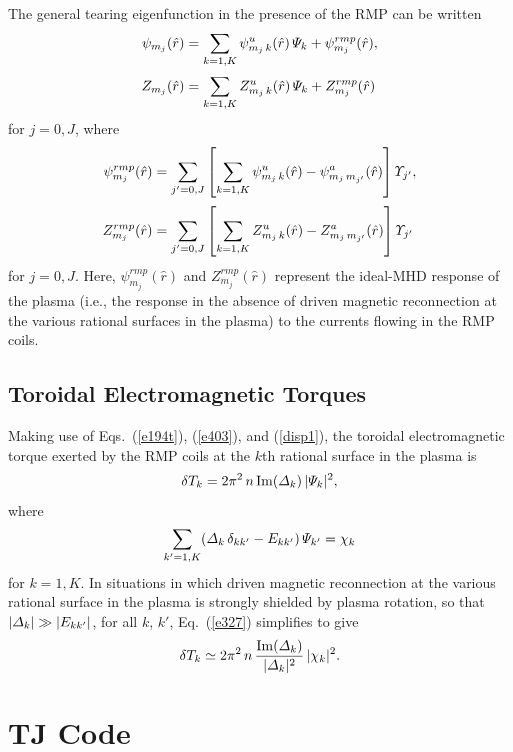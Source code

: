 \documentclass[12pt,prb,aps]{revtex4-1}
\begin{document}
The general tearing eigenfunction in the presence of the RMP can be written
\begin{align}
\psi_{m_j}(\hat{r})&= \sum_{k=1,K}\psi^u_{m_j\,k}(\hat{r})\,{\mit\Psi}_k +\psi_{m_j}^{rmp}(\hat{r}),\\[0.5ex]
Z_{m_j}(\hat{r})&= \sum_{k=1,K}Z^u_{m_j\,k}(\hat{r})\,{\mit\Psi}_k +Z_{m_j}^{rmp}(\hat{r})
\end{align}
for $j=0,J$, where
\begin{align}
\psi^{rmp}_{m_j}(\hat{r}) &= \sum_{j'=0,J}\left[\sum_{k=1,K}\psi_{m_j\,k}^u(\hat{r}) - \psi_{m_j\,m_{j'}}^a(\hat{r})\right]{\mit\Upsilon}_{j'},\\[0.5ex]
Z^{rmp}_{m_j}(\hat{r}) &= \sum_{j'=0,J}\left[\sum_{k=1,K}Z_{m_j\,k}^u(\hat{r}) - Z_{m_j\,m_{j'}}^a(\hat{r})\right]{\mit\Upsilon}_{j'}
\end{align}
for $j=0,J$. 
Here, $\psi^{rmp}_{m_j}(\hat{r})$ and $Z^{rmp}_{m_j}(\hat{r})$ represent the ideal-MHD response of the plasma (i.e., the response in the absence of
driven magnetic reconnection at the various rational surfaces in the plasma)  to the currents flowing in the RMP coils. 

\subsection{Toroidal Electromagnetic Torques}\label{troq}
Making use of Eqs.~(\ref{e194t}), (\ref{e403}), and (\ref{disp1}),  the toroidal electromagnetic torque exerted by the RMP coils at the $k$th rational
surface in the plasma is 
\begin{equation}\label{e327}
\delta T_k = 2\pi^2\,n\,{\rm Im}({\mit\Delta}_k)\,|{\mit\Psi}_k|^2,
\end{equation}
where
\begin{equation}
\sum_{k'=1,K}({\mit\Delta}_k\,\delta_{kk'}-E_{kk'})\,{\mit\Psi}_{k'} = \chi_k
\end{equation}
for $k=1,K$. In situations in which driven magnetic reconnection at the various rational surface in the plasma is
strongly shielded by plasma rotation,\cite{am3,rfa} so that $|{\mit\Delta}_k|\gg |E_{kk'}|$, for all $k$, $k'$, Eq.~(\ref{e327}) simplifies to give
\begin{equation}
\delta T_k\simeq 2\pi^2\,n\,\frac{{\rm Im}({\mit\Delta}_k)}{|{\mit\Delta}_k|^2}\,|{\mit\chi}_k|^2.
\end{equation}

\iffalse
\section{TJ Code}\label{tj}
\end{document}
